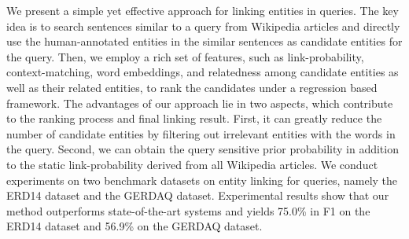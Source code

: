 We present a simple yet effective approach for linking entities in queries. The key idea is to search sentences similar to a query from Wikipedia articles and directly use the human-annotated entities in the similar sentences as candidate entities for the query. Then, we employ a rich set of features, such as link-probability, context-matching, word embeddings, and relatedness among candidate entities as well as their related entities, to rank the candidates under a regression based framework. The advantages of our approach lie in two aspects, which contribute to the ranking process and final linking result. First, it can greatly reduce the number of candidate entities by filtering out irrelevant entities with the words in the query. Second, we can obtain the query sensitive prior probability in addition to the static link-probability derived from all Wikipedia articles. We conduct experiments on two benchmark datasets on entity linking for queries, namely the ERD14 dataset and the GERDAQ dataset. Experimental results show that our method outperforms state-of-the-art systems and yields 75.0\% in F1 on the ERD14 dataset and 56.9\% on the GERDAQ dataset.
